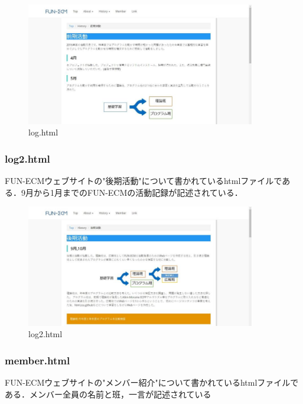\documentclass[openany,11pt,papersize]{jsbook}
\begin{document}
\begin{figure}[H]
  \begin{center} %
    \includegraphics[clip, width=10.0cm]{./figure/log.png}
    \caption{log.html} %
    \label{log} %
  \end{center}
\end{figure}

\subsubsection{log2.html}
FUN-ECMウェブサイトの"後期活動"について書かれているhtmlファイルである．9月から1月までのFUN-ECMの活動記録が記述されている．

\begin{figure}[H]
  \begin{center} %
    \includegraphics[clip, width=10.0cm]{./figure/log2.png}
    \caption{log2.html} %
    \label{log2} %
  \end{center}
\end{figure}

\subsubsection{member.html}
FUN-ECMウェブサイトの"メンバー紹介"について書かれているhtmlファイルである．メンバー全員の名前と班，一言が記述されている
\end{document}
